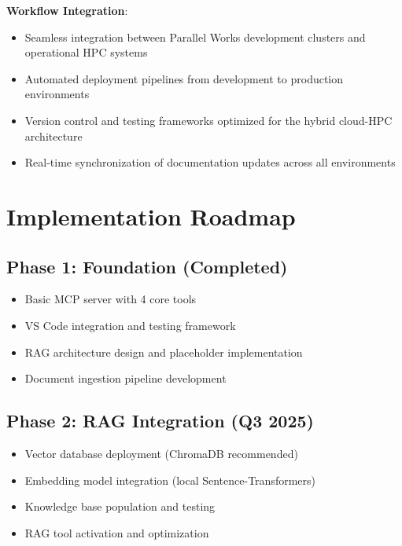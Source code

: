 \documentclass[11pt,letterpaper]{article}
\begin{document}
\textbf{Workflow Integration}:
\begin{itemize}
    \item Seamless integration between Parallel Works development clusters and operational HPC systems
    \item Automated deployment pipelines from development to production environments
    \item Version control and testing frameworks optimized for the hybrid cloud-HPC architecture
    \item Real-time synchronization of documentation updates across all environments
\end{itemize}

\section{Implementation Roadmap}

\begin{center}
\end{center}

\subsection{Phase 1: Foundation (Completed)}
\begin{itemize}[leftmargin=20pt]
    \item[\color{noaaBlue}$\checkmark$] Basic MCP server with 4 core tools
    \item[\color{noaaBlue}$\checkmark$] VS Code integration and testing framework
    \item[\color{noaaBlue}$\checkmark$] RAG architecture design and placeholder implementation
    \item[\color{noaaBlue}$\checkmark$] Document ingestion pipeline development
\end{itemize}

\subsection{Phase 2: RAG Integration (Q3 2025)}
\begin{itemize}[leftmargin=20pt]
    \item Vector database deployment (ChromaDB recommended)
    \item Embedding model integration (local Sentence-Transformers)
    \item Knowledge base population and testing
    \item RAG tool activation and optimization
\end{itemize}
\end{document}
